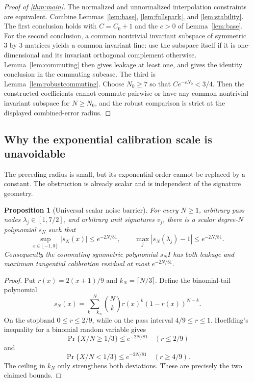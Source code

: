 \documentclass[11pt]{article}
\newtheorem{proposition}[theorem]{Proposition}
\theoremstyle{remark}
\begin{document}
\begin{proof}[Proof of \cref{thm:main}]
The normalized and unnormalized interpolation constraints are equivalent.
Combine Lemmas~\ref{lem:base}, \ref{lem:fullspark}, and \ref{lem:stability}.
The first conclusion holds with $C=C_0+1$ and the $c>0$ of
Lemma~\ref{lem:base}.  For the second conclusion, a common nontrivial invariant
subspace of symmetric $3$ by $3$ matrices yields a common invariant line: use
the subspace itself if it is one-dimensional and its invariant orthogonal
complement otherwise.  Lemma~\ref{lem:commuting} then gives leakage at least
one, and gives the identity conclusion in the commuting subcase.
The third is Lemma~\ref{lem:robustcommuting}.  Choose $N_0\ge7$ so that
$Ce^{-cN_0}<3/4$.  Then the constructed coefficients cannot commute pairwise
or have any common nontrivial invariant subspace for $N\ge N_0$, and the
robust comparison is strict at the displayed combined-error radius.
\end{proof}

\subsection{Why the exponential calibration scale is unavoidable}

The preceding radius is small, but its exponential order cannot be replaced by
a constant.  The obstruction is already scalar and is independent of the
signature geometry.

\begin{proposition}[Universal scalar noise barrier]\label{prop:scalarbarrier}
For every $N\ge1$, arbitrary pass nodes $\lambda_j\in[1,7/2]$, and arbitrary
unit signatures $v_j$, there is a scalar degree-$N$ polynomial $s_N$ such that
\[
 \sup_{x\in[-1,0]}|s_N(x)|\le e^{-2N/81},\qquad
 \max_j|s_N(\lambda_j)-1|\le e^{-2N/81}.
\]
Consequently the commuting symmetric polynomial $s_NI$ has both leakage and
maximum tangential calibration residual at most $e^{-2N/81}$.
\end{proposition}

\begin{proof}
Put $r(x)=2(x+1)/9$ and $k_N=\lceil N/3\rceil$.  Define the binomial-tail
polynomial
\[
 s_N(x)=\sum_{k=k_N}^N\binom{N}{k}r(x)^k(1-r(x))^{N-k}.
\]
On the stopband $0\le r\le2/9$, while on the pass interval
$4/9\le r\le1$.  Hoeffding's inequality for a binomial random variable
\cite{Hoeffding1963} gives
\[
 \Pr\{X/N\ge1/3\}\le e^{-2N/81}\quad(r\le2/9)
\]
and
\[
 \Pr\{X/N<1/3\}\le e^{-2N/81}\quad(r\ge4/9).
\]
The ceiling in $k_N$ only strengthens both deviations.  These are precisely
the two claimed bounds.
\end{proof}
\end{document}
